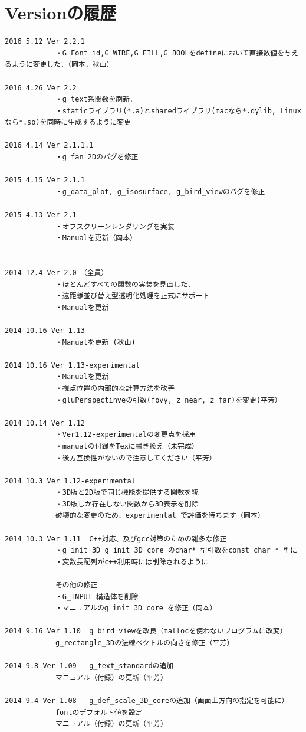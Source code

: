 \documentclass[a4paper,12pt]{jsarticle}%
\begin{document}
\newpage
\section{Versionの履歴}

\begin{verbatim}
2016 5.12 Ver 2.2.1
			・G_Font_id,G_WIRE,G_FILL,G_BOOLをdefineにおいて直接数値を与えるように変更した．（岡本，秋山）
			
2016 4.26 Ver 2.2
			・g_text系関数を刷新．
			・staticライブラリ(*.a)とsharedライブラリ(macなら*.dylib, Linuxなら*.so)を同時に生成するように変更
			
2016 4.14 Ver 2.1.1.1
			・g_fan_2Dのバグを修正

2015 4.15 Ver 2.1.1
			・g_data_plot, g_isosurface, g_bird_viewのバグを修正

2015 4.13 Ver 2.1   
			・オフスクリーンレンダリングを実装
			・Manualを更新（岡本）


2014 12.4 Ver 2.0　（全員）
			・ほとんどすべての関数の実装を見直した．
			・遠距離並び替え型透明化処理を正式にサポート
			・Manualを更新
			
2014 10.16 Ver 1.13
			・Manualを更新 (秋山)

2014 10.16 Ver 1.13-experimental
			・Manualを更新
			・視点位置の内部的な計算方法を改善
			・gluPerspectinveの引数(fovy, z_near, z_far)を変更(平芳）

2014 10.14 Ver 1.12
			・Ver1.12-experimentalの変更点を採用
			・manualの付録をTexに書き換え（未完成）
			・後方互換性がないので注意してください（平芳）

2014 10.3 Ver 1.12-experimental
			・3D版と2D版で同じ機能を提供する関数を統一
			・3D版しか存在しない関数から3D表示を削除
			破壊的な変更のため、experimental で評価を待ちます（岡本）

2014 10.3 Ver 1.11	C++対応、及びgcc対策のための雑多な修正
			・g_init_3D g_init_3D_core のchar* 型引数をconst char * 型に
			・変数長配列がc++利用時には削除されるように

			その他の修正
			・G_INPUT 構造体を削除
			・マニュアルのg_init_3D_core を修正（岡本）

2014 9.16 Ver 1.10	g_bird_viewを改良（mallocを使わないプログラムに改変）
			g_rectangle_3Dの法線ベクトルの向きを修正（平芳）

2014 9.8 Ver 1.09	g_text_standardの追加
			マニュアル（付録）の更新（平芳）

2014 9.4 Ver 1.08	g_def_scale_3D_coreの追加（画面上方向の指定を可能に）
			fontのデフォルト値を設定
			マニュアル（付録）の更新（平芳）


\end{verbatim}
\end{document}
